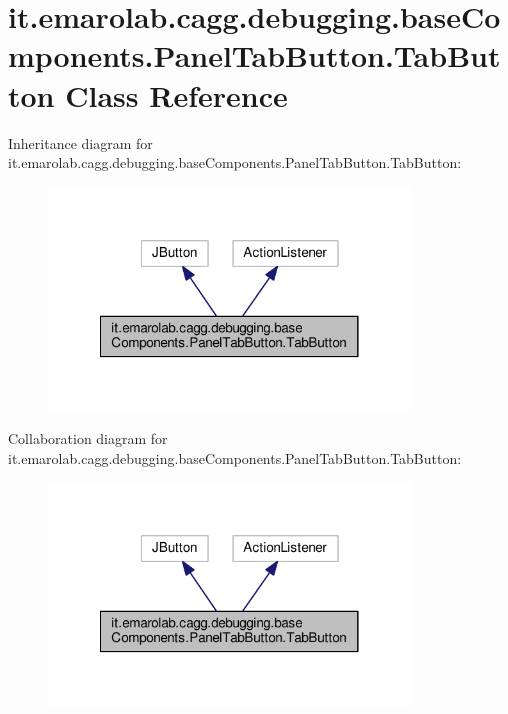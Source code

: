 \hypertarget{classit_1_1emarolab_1_1cagg_1_1debugging_1_1baseComponents_1_1PanelTabButton_1_1TabButton}{\section{it.\-emarolab.\-cagg.\-debugging.\-base\-Components.\-Panel\-Tab\-Button.\-Tab\-Button Class Reference}
\label{classit_1_1emarolab_1_1cagg_1_1debugging_1_1baseComponents_1_1PanelTabButton_1_1TabButton}
}


Inheritance diagram for it.\-emarolab.\-cagg.\-debugging.\-base\-Components.\-Panel\-Tab\-Button.\-Tab\-Button\-:\nopagebreak
\begin{figure}[H]
\begin{center}
\leavevmode
\includegraphics[width=272pt]{classit_1_1emarolab_1_1cagg_1_1debugging_1_1baseComponents_1_1PanelTabButton_1_1TabButton__inherit__graph}
\end{center}
\end{figure}


Collaboration diagram for it.\-emarolab.\-cagg.\-debugging.\-base\-Components.\-Panel\-Tab\-Button.\-Tab\-Button\-:\nopagebreak
\begin{figure}[H]
\begin{center}
\leavevmode
\includegraphics[width=272pt]{classit_1_1emarolab_1_1cagg_1_1debugging_1_1baseComponents_1_1PanelTabButton_1_1TabButton__coll__graph}
\end{center}
\end{figure}
